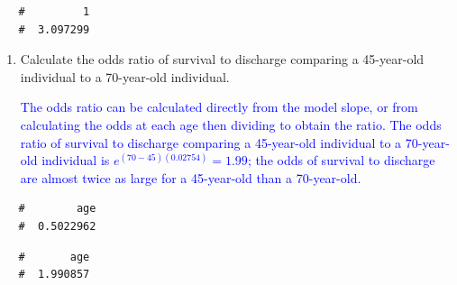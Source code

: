 \documentclass[letterpaper,12pt,twoside,]{pinp}
\begin{document}
\begin{enumerate}
\begin{Shaded}
\begin{Highlighting}[]
\end{Highlighting}
\end{Shaded}

  \begin{ShadedResult}
   \begin{verbatim}
   #         1 
   #  3.097299
   \end{verbatim}
   \end{ShadedResult}

  \begin{enumerate}
  \def\labelenumii{\alph{enumii})}
  \setcounter{enumii}{4}
  \item
    Calculate the odds ratio of survival to discharge comparing a
    45-year-old individual to a 70-year-old individual.

    \textcolor{blue}{The odds ratio can be calculated directly from the model slope, or from calculating the odds at each age then dividing to obtain the ratio. The odds ratio of survival to discharge comparing a 45-year-old individual to a 70-year-old individual is $e^{(70-45)(0.02754)} = 1.99$; the odds of survival to discharge are almost twice as large for a 45-year-old than a 70-year-old.}
  \end{enumerate}

\begin{Shaded}
\begin{Highlighting}[]
\StringTok{ }\OperatorTok{$}\NormalTok{coef[}\NormalTok{]}\OperatorTok{*}\NormalTok{(}\NormalTok{)}
\end{Highlighting}
\end{Shaded}

  \begin{ShadedResult}
   \begin{verbatim}
   #        age 
   #  0.5022962
   \end{verbatim}
   \end{ShadedResult}

\begin{Shaded}
\begin{Highlighting}[]
\NormalTok{(}\OperatorTok{-}
\end{Highlighting}
\end{Shaded}

  \begin{ShadedResult}
   \begin{verbatim}
   #       age 
   #  1.990857
   \end{verbatim}
   \end{ShadedResult}


\end{enumerate}
\end{document}
